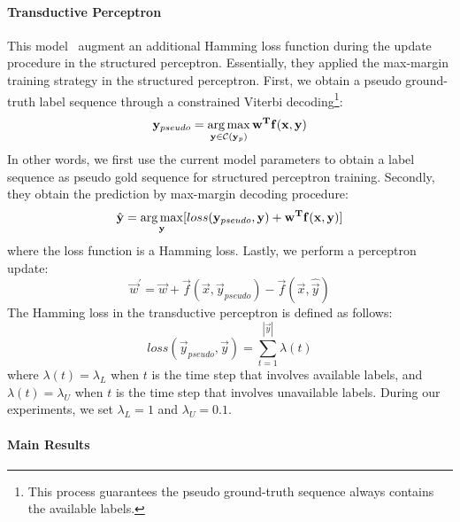\paragraph{Transductive Perceptron}
This model~\cite{fernandes2011learning} augment an additional Hamming loss function during the update procedure in the structured perceptron. 
Essentially, they applied the max-margin training strategy in the structured perceptron. 
First, we obtain a pseudo ground-truth label sequence through a constrained Viterbi decoding\footnote{This process guarantees the pseudo ground-truth sequence always contains the available labels.}: 
\begin{equation}
\mathbf{y}_{pseudo} = \operatorname*{arg\,max}_{\mathbf{y} \in \mathcal{C}(\mathbf{y}_p)} \mathbf{w}^{\mathbf{T}} \mathbf{f}(\mathbf{x}, \mathbf{y})
\end{equation}
In other words, we first use the current model parameters to obtain a label sequence as pseudo gold sequence for structured perceptron training. 
Secondly, they obtain the prediction by max-margin decoding procedure:
\begin{equation}
\hat{\mathbf{y}} = \operatorname*{arg\,max}_{\mathbf{y}} [loss(\mathbf{y}_{pseudo}, \mathbf{y}) + \mathbf{w}^{\mathbf{T}} \mathbf{f}(\mathbf{x}, \mathbf{y})]
\end{equation}
where the loss function is a Hamming loss. Lastly, we perform a perceptron update:
\begin{equation}
\vec{w}^\prime = \vec{w} + \vec{f}(\vec{x}, \vec{y}_{pseudo}) - \vec{f} (\vec{x}, \hat{\vec{y}})
\end{equation}
The Hamming loss in the transductive perceptron is defined as follows:
\begin{equation}
loss(\vec{y}_{pseudo}, \vec{y})
=
\sum_{t=1}^{|\vec{y}|}
\lambda(t)
\end{equation}
where $\lambda(t) = \lambda_L$ when $t$ is the time step that involves available labels, and $\lambda(t) = \lambda_U$ when $t$ is the time step that involves unavailable labels. 
During our experiments, we set $\lambda_L = 1$ and $\lambda_U =0.1$. 




\paragraph{Main Results}


